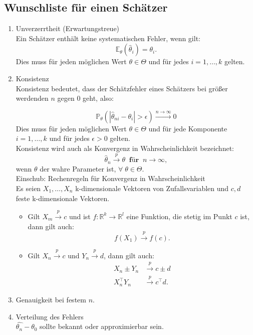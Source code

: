 \documentclass[10pt]{article}
\newcommand{\FZV}{X_1, \ldots, X_n} %
\newcommand{\IR}{\mathbb{R}} %
\newcommand{\EW}{\mathbb{E}} %
\newcommand{\KW}{\overset{p} \longrightarrow} %
\begin{document}
\subsection{Wunschliste für einen Schätzer}
\begin{enumerate}
	\item Unverzerrtheit (Erwartungstreue)\\
	Ein Schätzer enthält keine systematischen Fehler, wenn gilt:
	\begin{equation*}
		\EW_\theta(\hat{\theta}_i) = \theta_i.
	\end{equation*}
	Dies muss für jeden möglichen Wert $\theta \in \Theta$ und für jedes $i = 1, \ldots, k$ gelten. 
	
	\item Konsistenz \\
	Konsistenz bedeutet, dass der Schätzfehler eines Schätzers bei größer werdenden $n$ gegen $0$ geht, also:
	
	
	\begin{equation*}
			\mathbb{P}_\theta(|\hat{\theta}_{ni} - \theta_i| > \epsilon) \overset{n \rightarrow \infty}{\longrightarrow} 0
	\end{equation*}
	Dies muss für jeden möglichen Wert $\theta \in \Theta$ und für jede Komponente $i = 1, \ldots, k$ und für jedes $\epsilon > 0$ gelten.\\
	Konsistenz wird  auch als Konvergenz in Wahrscheinlichkeit bezeichnet:
	\begin{equation*}
		\hat{\theta}_n \overset{p} \longrightarrow \theta \;\; \textbf{für} \;\; n \rightarrow \infty,
	\end{equation*}
	wenn $\theta$ der wahre Parameter ist, \;  $\forall \; \theta \in \Theta$. \\
	
	\pagebreak
	Einschub: Rechenregeln für Konvergenz in Wahrscheinlichkeit\\
	
	
	Es seien $\FZV$ k-dimensionale Vektoren von Zufallsvariablen und $c,d$  feste k-dimensionale Vektoren. 
	\begin{itemize}
		\item Gilt $X_m \KW c$ und ist $f: \IR^k \rightarrow \IR^l$ eine Funktion, die stetig im Punkt $c$ ist, dann gilt auch: \begin{equation*}
		f(X_1) \KW f(c).
		\end{equation*}
		\item Gilt $X_n \KW c$ und $Y_n \KW d$, dann gilt auch:
		\begin{equation*}
			\begin{split}
			X_n \pm Y_n &\KW c \pm d\\
			X_n^\top Y_n &\KW c^\top d.
			\end{split}
		\end{equation*}
	\end{itemize}
	
	\item Genauigkeit bei festem $n$.
	\item Verteilung des Fehlers\\
	$\hat{\theta_n}-\theta_0$ sollte bekannt oder approximierbar sein. 
	
\end{enumerate}
\end{document}
